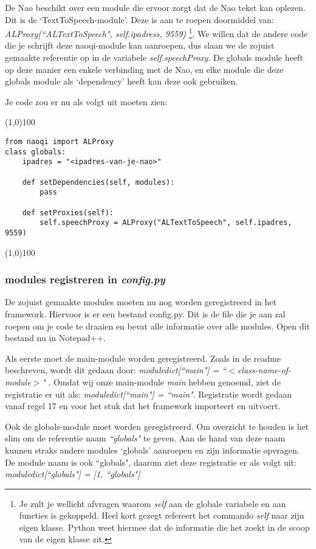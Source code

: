 \documentclass[a4paper]{article}
\begin{document}
De Nao beschikt over een module die ervoor zorgt dat de Nao tekst kan oplezen. Dit is de `TextToSpeech-module'. Deze is aan te roepen doormiddel van: \textit{ALProxy(``ALTextToSpeech", self.ipadress, 9559)} \footnote{Je zult je wellicht afvragen waarom \textit{self} aan de globale variabele en aan functies is gekoppeld. Heel kort gezegt refereert het commando \textit{self} naar zijn eigen klasse. Python weet hiermee dat de informatie die het zoekt in de scoop van de eigen klasse zit.}. We willen dat de andere code die je schrijft deze naoqi-module kan aanroepen, dus slaan we de zojuist gemaakte referentie op in de variabele \textit{self.speechProxy}. De globals module heeft op deze manier een enkele verbinding met de Nao, en elke module die deze globals module als `dependency' heeft kan deze ook gebruiken.

Je code zou er nu als volgt uit moeten zien:

\noindent \line(1,0){100}
\begin{verbatim}
from naoqi import ALProxy
class globals:
    ipadres = "<ipadres-van-je-nao>"

    def setDependencies(self, modules):
        pass

    def setProxies(self):
        self.speechProxy = ALProxy("ALTextToSpeech", self.ipadres, 9559)
\end{verbatim}
\noindent \line(1,0){100}

\subsubsection{modules registreren in \textit{config.py}}
De zojuist gemaakte modules moeten nu nog worden geregistreerd in het framework. Hiervoor is er een bestand config.py. Dit is de file die je aan zal roepen om je code te draaien en bevat alle informatie over alle modules. Open dit bestand nu in Notepad++.

Als eerste moet de main-module worden geregistreerd. Zoals in de readme beschreven, wordt dit gedaan door:
 \textit{moduledict[``main"] = ``$<$class-name-of-module$>$" }. 
Omdat wij onze main-module \textit{main} hebben genoemd, ziet de registratie er uit als: \textit{moduledict[``main"] = ``main"}.
Registratie wordt gedaan vanaf regel 17 en voor het stuk dat het framework importeert en uitvoert.

Ook de globals-module moet worden geregistreerd. Om overzicht te houden is het slim om de referentie naam \textit{``globals"} te geven. Aan de hand van deze naam kunnen straks andere modules `globals' aanroepen en zijn informatie opvragen. De module naam is ook ``globals", daarom ziet deze registratie er als volgt uit: \textit{moduledict[``globals"] = [1, ``globals"]}
\end{document}
